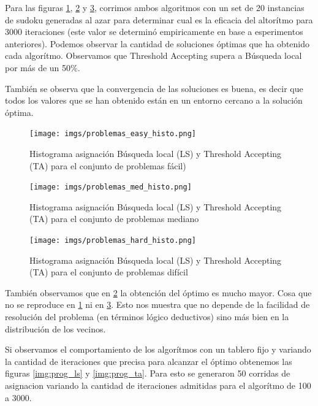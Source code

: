 \documentclass[a4paper,spanish]{article}
\begin{document}
Para las figuras  \ref{img:histo_easy}, \ref{img:histo_med} y
\ref{img:histo_hard}, corrimos ambos algoritmos con un set de 20 instancias de
sudoku generadas al azar para determinar cual es la eficacia del altorítmo para
3000 iteraciones (este valor se determinó empiricamente en base a esperimentos
anteriores).
Podemos observar la cantidad de soluciones óptimas que ha obtenido cada
algorítmo. Observamos que Threshold Accepting supera a Búsqueda local por más de
un 50\%.

También se observa que la convergencia de las soluciones es buena, es decir que
todos los valores que se han obtenido están en un entorno cercano a la solución
óptima.


\begin{center}
    \begin{figure}[H]
        \texttt{[image: imgs/problemas\_easy\_histo.png]}
        \caption{Histograma asignación Búsqueda local (LS) y Threshold
        Accepting (TA) para el conjunto de problemas fácil)}
        \label{img:histo_easy}
    \end{figure}
\end{center}
\begin{center}
    \begin{figure}[H]
        \texttt{[image: imgs/problemas\_med\_histo.png]}
        \caption{Histograma asignación Búsqueda local (LS) y Threshold
        Accepting (TA) para el conjunto de problemas mediano}
        \label{img:histo_med}
    \end{figure}
\end{center}
\begin{center}
    \begin{figure}[H]
        \texttt{[image: imgs/problemas\_hard\_histo.png]}
        \caption{Histograma asignación Búsqueda local (LS) y Threshold
        Accepting (TA) para el conjunto de problemas difícil}
        \label{img:histo_hard}
    \end{figure}
\end{center}

También observamos que en \ref{img:histo_med} la obtención del óptimo es mucho
mayor. Cosa que no se reproduce en \ref{img:histo_easy} ni en
\ref{img:histo_hard}. Esto nos muestra que no depende de la facilidad de
resolución del problema (en términos lógico deductivos) sino más bien en la
distribución de los vecinos.

Si observamos el comportamiento de los algorítmos con un tablero fijo y variando
la cantidad de iteraciones que precisa para alcanzar el óptimo obtenemos las
figuras \ref{img:prog_ls} y \ref{img:prog_ta}. Para esto se generaron 50
corridas de asignacion variando la cantidad de iteraciones admitidas para el
algorítmo de 100 a 3000.
\end{document}
